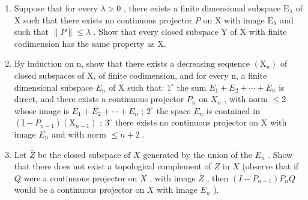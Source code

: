 \begin{enumerate}
\def\labelenumi{\alph{enumi})}
\item
  Suppose that for every \(\lambda > 0\) , there exists a finite dimensional subspace \(\mathrm{E}_{\lambda}\) of X such that there exists no continuous projector \(P\) on X with image \(\mathrm{E}_{\lambda}\) and such that \(\| P \| \leqslant \lambda\) . Show that every closed subspace Y of X with finite codimension has the same property as X.
\item
  By induction on n, show that there exists a decreasing sequence \((\mathrm{X}_{n})\) of closed subspaces of X, of finite codimension, and for every n, a finite dimensional subspace \(E_{n}\) of X such that: \(1^{\circ}\) the sum \(E_{1} + E_{2} + \cdots + E_{n}\) is direct, and there exists a continuous projector \(P_{n}\) on \(X_{n}\) , with norm \(\leqslant 2\) whose image is \(E_{1} + E_{2} + \cdots + E_{n}\) ; \(2^{\circ}\) the space \(E_{n}\) is contained in \((\mathrm{I} - P_{n-1})(\mathrm{X}_{n-1})\) ; \(3^{\circ}\) there exists no continuous projector on X with image \(E_{n}\) and with norm \(\leqslant n + 2\) .
\item
  Let \(\bar{Z}\) be the closed subspace of \(X\) generated by the union of the \(E_{n}\) . Show that there does not exist a topological complement of \(Z\) in \(X\) (observe that if \(Q\) were a continuous projector on \(X\) , with image \(\bar{Z}\) , then \((I - P_{n-1})P_nQ\) would be a continuous projector on \(X\) with image \(E_{n}\) ).
\end{enumerate}
